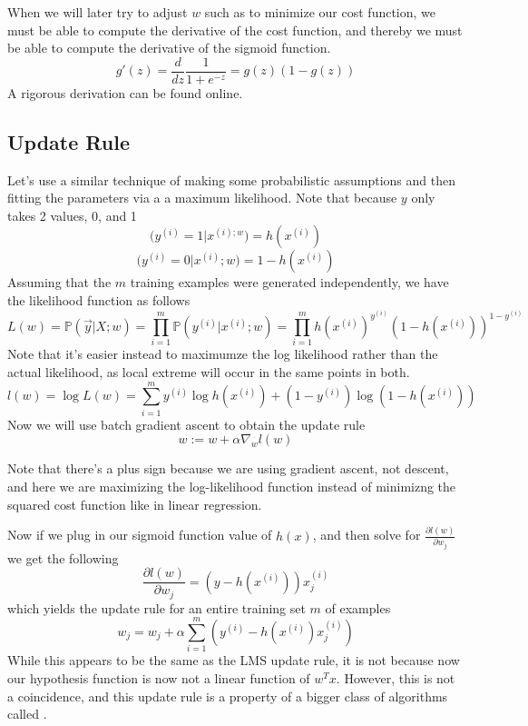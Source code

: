 \documentclass[12pt]{scrartcl}
\begin{document}
\begin{lemma}
    When we will later try to adjust $w$ such as to
    minimize our cost function, we must be able to compute the
    derivative of the cost function, and thereby we must be able
    to compute the derivative of the sigmoid function.
    \[g'(z) = \frac{d}{dz}\frac{1}{1 + e^{-z}}
        = g(z)(1-g(z))\]
    A rigorous derivation can be found online.
\end{lemma}

\subsection{Update Rule}

Let's use a similar technique of making some probabilistic assumptions and then
fitting the parameters via a a maximum likelihood. Note that because $y$ only
takes 2 values, 0, and 1
\[\mathbb(y^{(i)} = 1 | x^{(i); w}) = h(x^{(i)})\]
\[\mathbb(y^{(i)} = 0 | x^{(i)}; w) = 1 - h(x^{(i)})\]
Assuming that the $m$ training examples were generated independently, we have
the likelihood function as follows
\[L(w) = \mathbb{P}(\vec{y} | X; w) = \prod_{i=1}^m\mathbb{P}(y^{(i)} | x^{(i)}; w)
    = \prod_{i=1}^m h(x^{(i)})^{y^{(i)}}(1-h(x^{(i)}))^{1-y^{(i)}}\]
Note that it's easier instead to maximumze the log likelihood rather than the
actual likelihood, as local extreme will occur in the same points in both.
\[l(w) = \log L(w) = \sum_{i=1}^my^{(i)}\log h(x^{(i)}) + (1-y^{(i)})\log(1-h(x^{(i)}))\]
Now we will use batch gradient ascent to obtain the update rule
\[w:= w + \alpha \nabla_wl(w)\]
\begin{note}
    Note that there's a plus sign because we are using
    gradient ascent, not descent, and here we are maximizing the
    log-likelihood function instead of minimizng the
    squared cost function like in linear regression.
\end{note}
Now if we plug in our sigmoid function value of $h(x)$, and then solve for
$\frac{\partial l(w)}{\partial w_j}$ we get the following
\[\frac{\partial l(w)}{\partial w_j} = (y-h(x^{(i)}))x_j^{(i)}\]
which yields the update rule for an entire training set $m$ of examples
\[w_j = w_j + \alpha \sum_{i=1}^m (y^{(i)} - h(x^{(i)})x_j^{(i)})\]
While this appears to be the same as the LMS update rule, it is not because now
our hypothesis function is now not a linear function of $w^Tx$. However, this
is not a coincidence, and this update rule is a property of a bigger class of
algorithms called .
\end{document}
